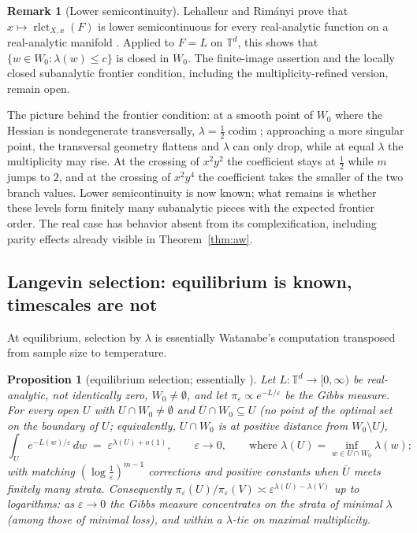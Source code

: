 \documentclass[11pt]{amsart}
\theoremstyle{plain}
\newtheorem{proposition}[theorem]{Proposition}
\theoremstyle{definition}
\newtheorem{remark}[theorem]{Remark}
\newcommand{\T}{\mathbb{T}}
\begin{document}
\begin{remark}[Lower semicontinuity]
Lehalleur and Rim\'anyi prove that $x\mapsto\operatorname{rlct}_{X,x}(F)$ is lower semicontinuous for every real-analytic function on a real-analytic manifold \cite[Proposition~8.4(ii)]{lehalleurrimanyi2024}. Applied to $F=L$ on $\T^d$, this shows that $\{w\in W_0:\lambda(w)\le c\}$ is closed in $W_0$. The finite-image assertion and the locally closed subanalytic frontier condition, including the multiplicity-refined version, remain open.
\end{remark}

The picture behind the frontier condition: at a smooth point of $W_0$ where the Hessian is nondegenerate transversally, $\lambda = \tfrac12 \operatorname{codim}$; approaching a more singular point, the transversal geometry flattens and $\lambda$ can only drop, while at equal $\lambda$ the multiplicity may rise. At the crossing of $x^2 y^2$ the coefficient stays at $\tfrac12$ while $m$ jumps to $2$, and at the crossing of $x^2 y^4$ the coefficient takes the smaller of the two branch values. Lower semicontinuity is now known; what remains is whether these levels form finitely many subanalytic pieces with the expected frontier order. The real case has behavior absent from its complexification, including parity effects already visible in Theorem~\ref{thm:aw}.

\subsection{Langevin selection: equilibrium is known, timescales are not}\label{sec:kramers}

At equilibrium, selection by $\lambda$ is essentially Watanabe's computation transposed from sample size to temperature.

\begin{proposition}[equilibrium selection; essentially \cite{watanabe2009}]\label{prop:gibbs}
Let $L\colon \T^d \to [0,\infty)$ be real-analytic, not identically zero, $W_0 \neq \emptyset$, and let $\pi_\varepsilon \propto e^{-L/\varepsilon}$ be the Gibbs measure. For every open $U$ with $U \cap W_0 \neq \emptyset$ and $\overline{U} \cap W_0 \subseteq U$ (no point of the optimal set on the boundary of $U$; equivalently, $U \cap W_0$ is at positive distance from $W_0 \setminus U$),
\[
   \int_U e^{-L(w)/\varepsilon}\, dw \;=\; \varepsilon^{\lambda(U) + o(1)}, \qquad \varepsilon \to 0,
   \qquad \text{where } \lambda(U) = \inf_{w \in U \cap W_0} \lambda(w);
\]
with matching $(\log \tfrac1\varepsilon)^{m-1}$ corrections and positive constants when $\overline U$ meets finitely many strata. Consequently $\pi_\varepsilon(U) / \pi_\varepsilon(V) \asymp \varepsilon^{\lambda(U) - \lambda(V)}$ up to logarithms: as $\varepsilon \to 0$ the Gibbs measure concentrates on the strata of minimal $\lambda$ (among those of minimal loss), and within a $\lambda$-tie on maximal multiplicity.
\end{proposition}
\end{document}
